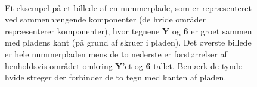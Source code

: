 \begin{figure}[htp]
  \centering
  \begin{minipage}[c]{8 cm}
	\end{minipage}\\
  \begin{minipage}[c]{8 cm}
	\end{minipage}
	\begin{minipage}[c]{8 cm}
	\end{minipage}
	\caption{Et eksempel på et billede af en nummerplade, som er repræsenteret ved sammenhængende komponenter (de hvide områder repræsenterer komponenter), hvor tegnene \textbf{Y} og \textbf{6} er groet sammen med pladens kant (på grund af skruer i pladen). Det øverste billede er hele nummerpladen mens de to nederste er forstørrelser af henholdsvis området omkring \textbf{Y}'et og \textbf{6}-tallet. Bemærk de tynde hvide streger der forbinder de to tegn med kanten af pladen.}
  \label{fig:skygge}
\end{figure}


